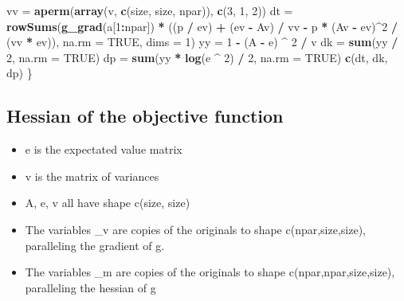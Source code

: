 \documentclass[]{article}
\newenvironment{Shaded}{\begin{snugshade}}{\end{snugshade}}
\newcommand{\DataTypeTok}[1]{\textcolor[rgb]{0.13,0.29,0.53}{#1}}
\newcommand{\DecValTok}[1]{\textcolor[rgb]{0.00,0.00,0.81}{#1}}
\newcommand{\KeywordTok}[1]{\textcolor[rgb]{0.13,0.29,0.53}{\textbf{#1}}}
\newcommand{\NormalTok}[1]{#1}
\newcommand{\OperatorTok}[1]{\textcolor[rgb]{0.81,0.36,0.00}{\textbf{#1}}}
\newcommand{\OtherTok}[1]{\textcolor[rgb]{0.56,0.35,0.01}{#1}}
\newcommand{\StringTok}[1]{\textcolor[rgb]{0.31,0.60,0.02}{#1}}
\providecommand{\tightlist}{%
  \setlength{\itemsep}{0pt}\setlength{\parskip}{0pt}}
\begin{document}
\begin{Shaded}
\begin{Highlighting}[]
\NormalTok{  vv =}\StringTok{ }\KeywordTok{aperm}\NormalTok{(}\KeywordTok{array}\NormalTok{(v, }\KeywordTok{c}\NormalTok{(size, size, npar)), }\KeywordTok{c}\NormalTok{(}\DecValTok{3}\NormalTok{, }\DecValTok{1}\NormalTok{, }\DecValTok{2}\NormalTok{))}
\NormalTok{  dt =}\StringTok{ }\KeywordTok{rowSums}\NormalTok{(}\KeywordTok{g_grad}\NormalTok{(a[}\DecValTok{1}\OperatorTok{:}\NormalTok{npar]) }\OperatorTok{*}\StringTok{ }\NormalTok{((p }\OperatorTok{/}\StringTok{ }\NormalTok{ev) }\OperatorTok{+}\StringTok{ }\NormalTok{(ev }\OperatorTok{-}\StringTok{ }\NormalTok{Av) }\OperatorTok{/}\StringTok{ }\NormalTok{vv }\OperatorTok{-}\StringTok{ }\NormalTok{p }\OperatorTok{*}\StringTok{ }
\StringTok{                                      }\NormalTok{(Av }\OperatorTok{-}\StringTok{ }\NormalTok{ev)}\OperatorTok{^}\DecValTok{2} \OperatorTok{/}\StringTok{ }\NormalTok{(vv }\OperatorTok{*}\StringTok{ }\NormalTok{ev)),}
               \DataTypeTok{na.rm =} \OtherTok{TRUE}\NormalTok{,}
               \DataTypeTok{dims =} \DecValTok{1}\NormalTok{)}
\NormalTok{  yy =}\StringTok{ }\DecValTok{1} \OperatorTok{-}\StringTok{ }\NormalTok{(A }\OperatorTok{-}\StringTok{ }\NormalTok{e) }\OperatorTok{^}\StringTok{ }\DecValTok{2} \OperatorTok{/}\StringTok{ }\NormalTok{v}
\NormalTok{  dk =}\StringTok{ }\KeywordTok{sum}\NormalTok{(yy }\OperatorTok{/}\StringTok{ }\DecValTok{2}\NormalTok{, }\DataTypeTok{na.rm =} \OtherTok{TRUE}\NormalTok{)}
\NormalTok{  dp =}\StringTok{ }\KeywordTok{sum}\NormalTok{(yy }\OperatorTok{*}\StringTok{ }\KeywordTok{log}\NormalTok{(e }\OperatorTok{^}\StringTok{ }\DecValTok{2}\NormalTok{) }\OperatorTok{/}\StringTok{ }\DecValTok{2}\NormalTok{, }\DataTypeTok{na.rm =} \OtherTok{TRUE}\NormalTok{)}
  \KeywordTok{c}\NormalTok{(dt, dk, dp)}
\NormalTok{\}}
\end{Highlighting}
\end{Shaded}

\hypertarget{hessian-of-the-objective-function}{%
\subsection{Hessian of the objective
function}\label{hessian-of-the-objective-function}}

\begin{itemize}
\tightlist
\item
  e is the expectated value matrix
\item
  v is the matrix of variances
\item
  A, e, v all have shape c(size, size)
\item
  The variables \_v are copies of the originals to shape
  c(npar,size,size), paralleling the gradient of g.
\item
  The variables \_m are copies of the originals to shape
  c(npar,npar,size,size), paralleling the hessian of g
\end{itemize}
\end{document}
